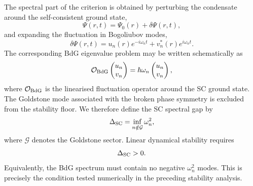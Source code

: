 \documentclass[epj]{svjour}
\begin{document}
The spectral part of the criterion is obtained by perturbing the condensate
around the self-consistent ground state,
\begin{equation}
\Psi(r,t)
=
\Psi_0(r)
+
\delta\Psi(r,t),
\label{eq:SC_perturbation}
\end{equation}
and expanding the fluctuation in Bogoliubov modes,
\begin{equation}
\delta\Psi(r,t)
=
u_n(r)e^{-i\omega_n t}
+
v_n^*(r)e^{i\omega_n t}.
\label{eq:SC_bdg_expansion}
\end{equation}
The corresponding BdG eigenvalue problem may be written schematically as
\begin{equation}
\mathcal{O}_{\rm BdG}
\begin{pmatrix}
u_n\\
v_n
\end{pmatrix}
=
\hbar\omega_n
\begin{pmatrix}
u_n\\
v_n
\end{pmatrix},
\label{eq:SC_bdg_operator}
\end{equation}
where $\mathcal{O}_{\rm BdG}$ is the linearised fluctuation operator around the
SC ground state. The Goldstone mode associated with the broken phase symmetry is
excluded from the stability floor. We therefore define the SC spectral gap by
\begin{equation}
\Delta_{\rm SC}
=
\inf_{n\notin\mathcal{G}}
\omega_n^2 ,
\label{eq:SC_spectral_gap}
\end{equation}
where $\mathcal{G}$ denotes the Goldstone sector. Linear dynamical stability
requires
\begin{equation}
\Delta_{\rm SC}>0 .
\label{eq:SC_positive_gap}
\end{equation}
Equivalently, the BdG spectrum must contain no negative $\omega_n^2$ modes.
This is precisely the condition tested numerically in the preceding stability
analysis.
\end{document}
